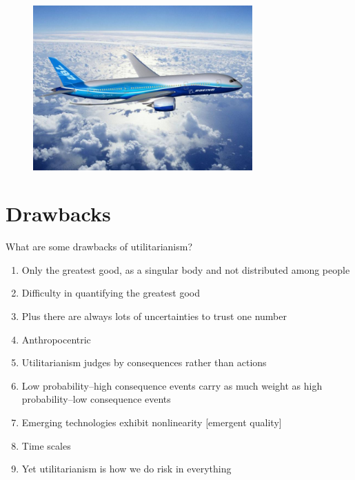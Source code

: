 \documentclass[aspectratio=1610,pdftex,dvipsnames,compress,xcolor={dvipsnames}]{beamer}
\begin{document}
\addtocounter{framenumber}{-1}
\begin{frame}{}
    \begin{figure}
        \centering
        \includegraphics[width=0.75\textwidth]{dreamliner.jpg}
    \end{figure}
\end{frame}


\section{Drawbacks}


\addtocounter{framenumber}{-1}
\begin{frame}{What are some drawbacks of utilitarianism?}
    \begin{enumerate}[series=outerlist,topsep=0pt,itemsep=11pt,leftmargin=*,label=(\arabic*)]
        \item[]Only the greatest good, as a singular body and not distributed among people
        \item[]Difficulty in quantifying the greatest good
        \item[]Plus there are always lots of uncertainties to trust one number
        \item[]Anthropocentric
        \item[]Utilitarianism judges by consequences rather than actions
        \item[]Low probability--high consequence events carry as much weight as high probability--low consequence events
        \item[]Emerging technologies exhibit nonlinearity [emergent quality]
        \item[]Time scales
        \item[]Yet utilitarianism is how we do risk in everything
    \end{enumerate}
\end{frame}
\end{document}
